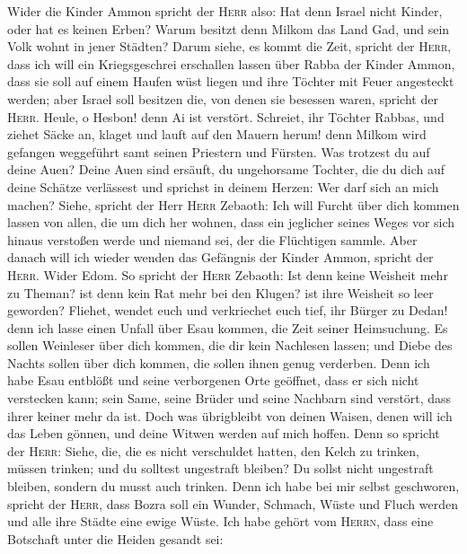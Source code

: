  Wider die Kinder Ammon spricht der \textsc{Herr} also:
Hat denn Israel nicht Kinder, oder hat es keinen Erben? Warum besitzt
denn Milkom das Land Gad, und sein Volk wohnt in jener Städten?
 Darum siehe, es kommt die Zeit, spricht der
\textsc{Herr}, dass ich will ein Kriegsgeschrei erschallen lassen über
Rabba der Kinder Ammon, dass sie soll auf einem Haufen wüst liegen und
ihre Töchter mit Feuer angesteckt werden; aber Israel soll besitzen die,
von denen sie besessen waren, spricht der \textsc{Herr}. 
Heule, o Hesbon! denn Ai ist verstört. Schreiet, ihr Töchter Rabbas, und
ziehet Säcke an, klaget und lauft auf den Mauern herum! denn Milkom wird
gefangen weggeführt samt seinen Priestern und Fürsten. 
Was trotzest du auf deine Auen? Deine Auen sind ersäuft, du ungehorsame
Tochter, die du dich auf deine Schätze verlässest und sprichst in deinem
Herzen: Wer darf sich an mich machen?  Siehe, spricht der
Herr \textsc{Herr} Zebaoth: Ich will Furcht über dich kommen lassen von
allen, die um dich her wohnen, dass ein jeglicher seines Weges vor sich
hinaus verstoßen werde und niemand sei, der die Flüchtigen sammle.
 Aber danach will ich wieder wenden das Gefängnis der
Kinder Ammon, spricht der \textsc{Herr}.  Wider Edom. So
spricht der \textsc{Herr} Zebaoth: Ist denn keine Weisheit mehr zu
Theman? ist denn kein Rat mehr bei den Klugen? ist ihre Weisheit so leer
geworden?  Fliehet, wendet euch und verkriechet euch tief,
ihr Bürger zu Dedan! denn ich lasse einen Unfall über Esau kommen, die
Zeit seiner Heimsuchung.  Es sollen Weinleser über dich
kommen, die dir kein Nachlesen lassen; und Diebe des Nachts sollen über
dich kommen, die sollen ihnen genug verderben.  Denn ich
habe Esau entblößt und seine verborgenen Orte geöffnet, dass er sich
nicht verstecken kann; sein Same, seine Brüder und seine Nachbarn sind
verstört, dass ihrer keiner mehr da ist.  Doch was
übrigbleibt von deinen Waisen, denen will ich das Leben gönnen, und
deine Witwen werden auf mich hoffen.  Denn so spricht der
\textsc{Herr}: Siehe, die, die es nicht verschuldet hatten, den Kelch zu
trinken, müssen trinken; und du solltest ungestraft bleiben? Du sollst
nicht ungestraft bleiben, sondern du musst auch trinken. 
Denn ich habe bei mir selbst geschworen, spricht der \textsc{Herr}, dass
Bozra soll ein Wunder, Schmach, Wüste und Fluch werden und alle ihre
Städte eine ewige Wüste.  Ich habe gehört vom
\textsc{Herrn}, dass eine Botschaft unter die Heiden gesandt sei:
